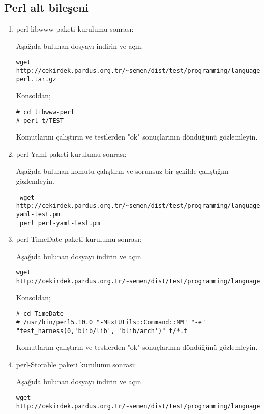 \documentclass[a4paper,10pt]{article}
\begin{document}
\subsection{Perl alt bileşeni}
\begin{enumerate}
\item perl-libwww paketi kurulumu sonrası:

Aşağıda bulunan dosyayı indirin ve açın.
\begin{verbatim}
wget http://cekirdek.pardus.org.tr/~semen/dist/test/programming/language/perl/libwww-perl.tar.gz
\end{verbatim}

Konsoldan;
\begin{verbatim}
# cd libwww-perl
# perl t/TEST
\end{verbatim}

Komutlarını çalıştırın ve testlerden "ok" sonuçlarının döndüğünü gözlemleyin.

\item perl-Yaml paketi kurulumu sonrası:

Aşağıda bulunan komutu çalıştırın ve sorunsuz bir şekilde çalıştığını gözlemleyin.
\begin{verbatim}
 wget http://cekirdek.pardus.org.tr/~semen/dist/test/programming/language/perl/perl-yaml-test.pm
 perl perl-yaml-test.pm
\end{verbatim}

\item perl-TimeDate paketi kurulumu sonrası:

Aşağıda bulunan dosyayı indirin ve açın.
\begin{verbatim}
wget http://cekirdek.pardus.org.tr/~semen/dist/test/programming/language/perl/TimeDate.tar.gz
\end{verbatim}

Konsoldan;
\begin{verbatim}
# cd TimeDate
# /usr/bin/perl5.10.0 "-MExtUtils::Command::MM" "-e" "test_harness(0,'blib/lib', 'blib/arch')" t/*.t
\end{verbatim}

Komutlarını çalıştırın ve testlerden "ok" sonuçlarının döndüğünü gözlemleyin.

\item perl-Storable paketi kurulumu sonrası:

Aşağıda bulunan dosyayı indirin ve açın.
\begin{verbatim}
wget http://cekirdek.pardus.org.tr/~semen/dist/test/programming/language/perl/Storable.tar.gz
\end{verbatim}


\end{enumerate}
\end{document}
